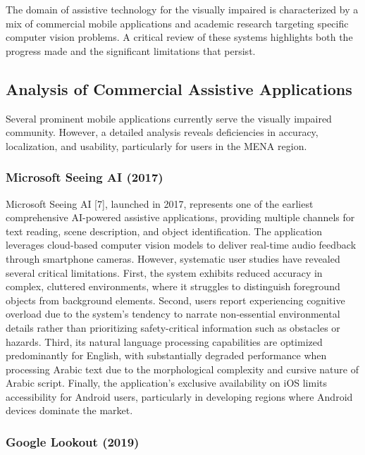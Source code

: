 \documentclass[a4paper]{report}
\begin{document}
The domain of assistive technology for the visually impaired is characterized by a mix of commercial mobile applications and academic research targeting specific computer vision problems. A critical review of these systems highlights both the progress made and the significant limitations that persist.

\subsection{Analysis of Commercial Assistive Applications}

Several prominent mobile applications currently serve the visually impaired community. However, a detailed analysis reveals deficiencies in accuracy, localization, and usability, particularly for users in the MENA region.

\subsubsection{Microsoft Seeing AI (2017)}

Microsoft Seeing AI [7], launched in 2017, represents one of the earliest comprehensive AI-powered assistive applications, providing multiple channels for text reading, scene description, and object identification. The application leverages cloud-based computer vision models to deliver real-time audio feedback through smartphone cameras. However, systematic user studies have revealed several critical limitations. First, the system exhibits reduced accuracy in complex, cluttered environments, where it struggles to distinguish foreground objects from background elements. Second, users report experiencing cognitive overload due to the system's tendency to narrate non-essential environmental details rather than prioritizing safety-critical information such as obstacles or hazards. Third, its natural language processing capabilities are optimized predominantly for English, with substantially degraded performance when processing Arabic text due to the morphological complexity and cursive nature of Arabic script. Finally, the application's exclusive availability on iOS limits accessibility for Android users, particularly in developing regions where Android devices dominate the market.

\subsubsection{Google Lookout (2019)}
\end{document}
